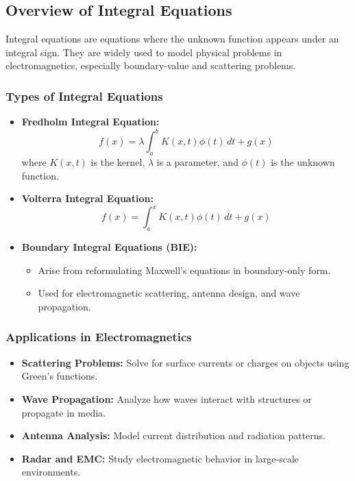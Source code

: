 \documentclass[12pt]{article}
\begin{document}
\subsection{Overview of Integral Equations}
Integral equations are equations where the unknown function appears under an integral sign. They are widely used to model physical problems in electromagnetics, especially boundary-value and scattering problems.

\subsubsection{Types of Integral Equations}
\begin{itemize}
    \item \textbf{Fredholm Integral Equation:}
          \[
              f(x) = \lambda \int_a^b K(x, t)\phi(t) \,dt + g(x)
          \]
          where \(K(x, t)\) is the kernel, \(\lambda\) is a parameter, and \(\phi(t)\) is the unknown function.
    \item \textbf{Volterra Integral Equation:}
          \[
              f(x) = \int_a^x K(x, t)\phi(t) \,dt + g(x)
          \]
    \item \textbf{Boundary Integral Equations (BIE):}
          \begin{itemize}
              \item Arise from reformulating Maxwell’s equations in boundary-only form.
              \item Used for electromagnetic scattering, antenna design, and wave propagation.
          \end{itemize}
\end{itemize}

\subsubsection{Applications in Electromagnetics}
\begin{itemize}
    \item \textbf{Scattering Problems:} Solve for surface currents or charges on objects using Green’s functions.
    \item \textbf{Wave Propagation:} Analyze how waves interact with structures or propagate in media.
    \item \textbf{Antenna Analysis:} Model current distribution and radiation patterns.
    \item \textbf{Radar and EMC:} Study electromagnetic behavior in large-scale environments.
\end{itemize}
\end{document}
